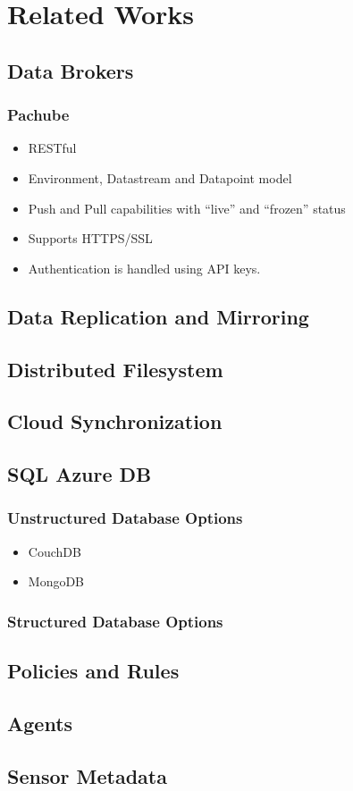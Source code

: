 \section{Related Works}
	\subsection{Data Brokers}
		\subsubsection{Pachube}
\begin{itemize}
\item RESTful
\item Environment, Datastream and Datapoint model
\item Push and Pull capabilities with ``live'' and ``frozen'' status
\item Supports HTTPS/SSL
\item Authentication is handled using API keys.
\end{itemize}		
	\subsection{Data Replication and Mirroring}
	\subsection{Distributed Filesystem}
	\subsection{Cloud Synchronization}
	\cite{uppoor2010cloud}
	\subsection{SQL Azure DB}
	\subsubsection{Unstructured Database Options}
\begin{itemize}
\item CouchDB
\item MongoDB
\end{itemize}
	\subsubsection{Structured Database Options}
	\subsection{Policies and Rules}
	\subsection{Agents}
	\subsection{Sensor Metadata}
